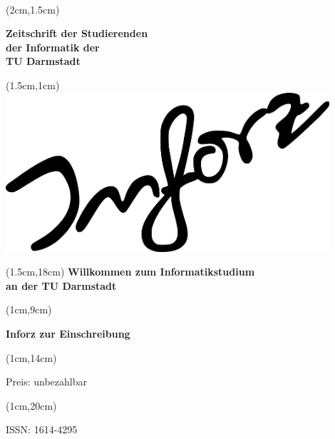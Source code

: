 \begin{titlepage}~

    \begin{textblock*}{12cm}(2cm,1.5cm)
        \begin{flushleft}
            \large\sffamily\textbf{
                \newline
                Zeitschrift der Studierenden\\
                der Informatik der \\
                TU Darmstadt}
        \end{flushleft}
    \end{textblock*}


    \begin{textblock*}{12cm}(1.5cm,1cm)
        \includegraphics[width=12cm]{../grafik/inforz}
    \end{textblock*}


    \begin{textblock*}{12cm}(1.5cm,18cm)
        \centering\Huge\sffamily\textbf{
            \textcolor{creme}{Willkommen zum Informatikstudium \\
                an der TU Darmstadt}}
    \end{textblock*}



    \begin{textblock*}{5cm}(1cm,9cm)
        \begin{rotate}{90}
            \sffamily\huge\textbf{
                Inforz zur Einschreibung \the\year}
        \end{rotate}
    \end{textblock*}


    \begin{textblock*}{2cm}(1cm,14cm)
        \begin{rotate}{90}
            \sffamily\small Preis: unbezahlbar
        \end{rotate}
    \end{textblock*}


    \begin{textblock*}{2cm}(1cm,20cm)
        \begin{rotate}{90}
            \sffamily ISSN: 1614-4295
        \end{rotate}
    \end{textblock*}

\end{titlepage}
\newpage
